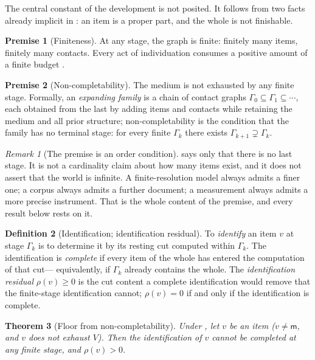 \documentclass[11pt,twocolumn,a4paper]{article}
\theoremstyle{dirthm}
\newtheorem{theorem}{Theorem}[section]
\theoremstyle{definition}
\newtheorem{definition}[theorem]{Definition}
\newtheorem{axiom}{Premise}
\theoremstyle{remark}
\newtheorem{remark}[theorem]{Remark}
\newcommand{\Gph}{\Gamma}
\newcommand{\V}{V}
\newcommand{\med}{\mathsf{m}}
\newcommand{\res}{\rho}
\begin{document}
The central constant of the development is not posited. It follows from two
facts already implicit in : an item is a proper part, and the
whole is not finishable.

\begin{axiom}[Finiteness]
\label{ax:finite}
At any stage, the graph is finite: finitely many items, finitely many
contacts. Every act of individuation consumes a positive amount of a finite
budget \citep{simon1955,simon1956}.
\end{axiom}

\begin{axiom}[Non-completability]
\label{ax:noncompletable}
The medium is not exhausted by any finite stage. Formally, an
\emph{expanding family} is a chain of contact graphs
$\Gph_0\subseteq\Gph_1\subseteq\cdots$, each obtained from the last by
adding items and contacts while retaining the medium and all prior
structure; non-completability is the condition that the family has no
terminal stage: for every finite $\Gph_k$ there exists
$\Gph_{k+1}\supsetneq\Gph_k$.
\end{axiom}

\begin{remark}[The premise is an order condition]
\label{rem:order-condition}
 says only that there is no last stage. It is not a
cardinality claim about how many items exist, and it does not assert that
the world is infinite. A finite-resolution model always admits a finer one;
a corpus always admits a further document; a measurement always admits a
more precise instrument. That is the whole content of the premise, and every
result below rests on it.
\end{remark}

\begin{definition}[Identification; identification residual]
\label{def:residual}
To \emph{identify} an item $v$ at stage $\Gph_k$ is to determine it by its
resting cut computed within $\Gph_k$. The identification is \emph{complete}
if every item of the whole has entered the computation of that cut---%
equivalently, if $\Gph_k$ already contains the whole. The
\emph{identification residual} $\res(v)\ge0$ is the cut content a complete
identification would remove that the finite-stage identification cannot;
$\res(v)=0$ if and only if the identification is complete.
\end{definition}

\begin{theorem}[Floor from non-completability]
\label{thm:floor-derived}
Under , let $v$ be an item ($v\neq\med$,
and $v$ does not exhaust $\V$). Then the identification of $v$ cannot be
completed at any finite stage, and $\res(v)>0$.
\end{theorem}
\end{document}
